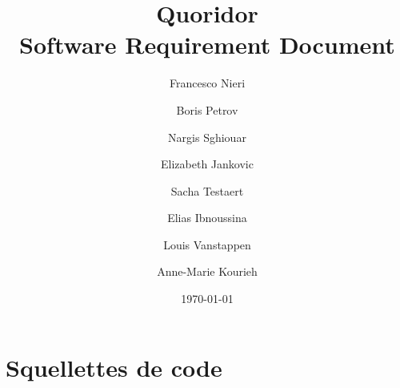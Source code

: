 \documentclass[11pt,a4paper,titlepage]{article}
\title{{\Huge Quoridor\\ }Software Requirement Document}
\author{Francesco Nieri \and Boris Petrov \and Nargis Sghiouar \and Elizabeth Jankovic \and Sacha Testaert \and Elias Ibnoussina \and Louis Vanstappen \and Anne-Marie Kourieh}
\date{\today}
\newcommand{\addcode}[3]{
    \begin{figure}[H]
        \centering
        
    \end{figure}
}
\begin{document}
\maketitle
\tableofcontents














\section{Squellettes de code}

\addcode{../src/resources/Board.h}{C++}{}
\addcode{../src/resources/BoardPrinter.h}{C++}{}
\addcode{../src/resources/Cell.h}{C++}{}
\addcode{../src/resources/chatbox.h}{C++}{}
\addcode{../src/resources/Chat.h}{C++}{}
\addcode{../src/resources/const.h}{C++}{}
\addcode{../src/resources/date.h}{C++}{}
\addcode{../src/resources/EndGame.h}{C++}{}
\addcode{../src/resources/JoinGame.h}{C++}{}
\addcode{../src/resources/leaderboard.h}{C++}{}
\addcode{../src/resources/LeaderBoard.h}{C++}{}
\addcode{../src/resources/loginhandler.h}{C++}{}
\addcode{../src/resources/Mainwindow.h}{C++}{}
\addcode{../src/resources/message.h}{C++}{}
\addcode{../src/resources/passwordencrypter.h}{C++}{}
\addcode{../src/resources/PlayerAction.h}{C++}{}
\addcode{../src/resources/PlayerBoard.h}{C++}{}
\addcode{../src/resources/PlayerEnum.h}{C++}{}
\addcode{../src/resources/Player.h}{C++}{}
\addcode{../src/resources/Point.h}{C++}{}
\addcode{../src/resources/registerhandler.h}{C++}{}
\addcode{../src/resources/RestartGame.h}{C++}{}
\addcode{../src/resources/SaveGame.h}{C++}{}
\addcode{../src/resources/Score.h}{C++}{}
\addcode{../src/resources/StartGame.h}{C++}{}
\addcode{../src/resources/StartSavedGame.h}{C++}{}
\addcode{../src/resources/user.h}{C++}{}
\addcode{../src/resources/WallAction.h}{C++}{}
\addcode{../src/resources/WallBoard.h}{C++}{}
\addcode{../src/resources/Wall.h}{C++}{}
\end{document}
